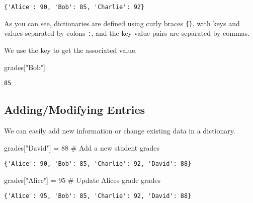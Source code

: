 \documentclass[
  letterpaper,
  DIV=11,
  numbers=noendperiod]{scrreprt}
\newenvironment{Shaded}{\begin{snugshade}}{\end{snugshade}}
\newcommand{\CommentTok}[1]{\textcolor[rgb]{0.37,0.37,0.37}{#1}}
\newcommand{\DecValTok}[1]{\textcolor[rgb]{0.68,0.00,0.00}{#1}}
\newcommand{\NormalTok}[1]{\textcolor[rgb]{0.00,0.23,0.31}{#1}}
\newcommand{\OperatorTok}[1]{\textcolor[rgb]{0.37,0.37,0.37}{#1}}
\newcommand{\StringTok}[1]{\textcolor[rgb]{0.13,0.47,0.30}{#1}}
\begin{document}
\begin{verbatim}
{'Alice': 90, 'Bob': 85, 'Charlie': 92}
\end{verbatim}

As you can see, dictionaries are defined using curly braces
\texttt{\{\}}, with keys and values separated by colons \texttt{:}, and
the key-value pairs are separated by commas.

We use the key to get the associated value.

\begin{Shaded}
\begin{Highlighting}[]
\NormalTok{grades[}\StringTok{"Bob"}\NormalTok{]}
\end{Highlighting}
\end{Shaded}

\begin{verbatim}
85
\end{verbatim}

\subsection{Adding/Modifying Entries}\label{addingmodifying-entries}

We can easily add new information or change existing data in a
dictionary.

\begin{Shaded}
\begin{Highlighting}[]
\NormalTok{grades[}\StringTok{"David"}\NormalTok{] }\OperatorTok{=} \DecValTok{88}  \CommentTok{\# Add a new student}
\NormalTok{grades}
\end{Highlighting}
\end{Shaded}

\begin{verbatim}
{'Alice': 90, 'Bob': 85, 'Charlie': 92, 'David': 88}
\end{verbatim}

\begin{Shaded}
\begin{Highlighting}[]
\NormalTok{grades[}\StringTok{"Alice"}\NormalTok{] }\OperatorTok{=} \DecValTok{95}  \CommentTok{\# Update Alice\textquotesingle{}s grade}
\NormalTok{grades}
\end{Highlighting}
\end{Shaded}

\begin{verbatim}
{'Alice': 95, 'Bob': 85, 'Charlie': 92, 'David': 88}
\end{verbatim}
\end{document}
